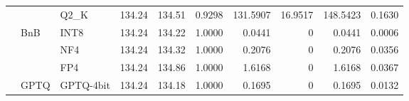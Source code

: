 \begin{longtable}{ll l rrrrrrr}
 &  & Q2\_K & 134.24 & 134.51 & \cellcolor{red!18} 0.9298 & \cellcolor{red!18} 131.5907 & 16.9517 & \cellcolor{red!18} 148.5423 & \cellcolor{red!18} 0.1630 \\
 & BnB & INT8 & 134.24 & 134.22 & 1.0000 & 0.0441 & \cellcolor{cyan!12} $0$ & 0.0441 & 0.0006 \\
 &  & NF4 & 134.24 & 134.32 & 1.0000 & 0.2076 & \cellcolor{cyan!12} $0$ & 0.2076 & 0.0356 \\
 &  & FP4 & 134.24 & 134.86 & 1.0000 & 1.6168 & \cellcolor{cyan!12} $0$ & 1.6168 & 0.0367 \\
 & GPTQ & GPTQ-4bit & 134.24 & 134.18 & 1.0000 & 0.1695 & \cellcolor{cyan!12} $0$ & 0.1695 & 0.0132 \\
\end{longtable}
\endgroup